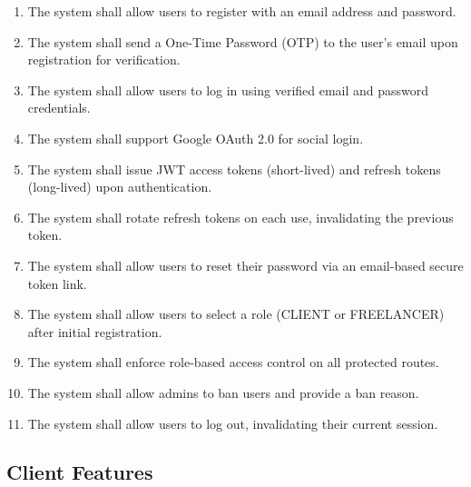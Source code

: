 \begin{enumerate}[label=FR-AUTH-\arabic*]
  \item The system shall allow users to register with an email address and password.
  \item The system shall send a One-Time Password (OTP) to the user's email upon registration for verification.
  \item The system shall allow users to log in using verified email and password credentials.
  \item The system shall support Google OAuth 2.0 for social login.
  \item The system shall issue JWT access tokens (short-lived) and refresh tokens (long-lived) upon authentication.
  \item The system shall rotate refresh tokens on each use, invalidating the previous token.
  \item The system shall allow users to reset their password via an email-based secure token link.
  \item The system shall allow users to select a role (CLIENT or FREELANCER) after initial registration.
  \item The system shall enforce role-based access control on all protected routes.
  \item The system shall allow admins to ban users and provide a ban reason.
  \item The system shall allow users to log out, invalidating their current session.
\end{enumerate}

\subsection{Client Features}


